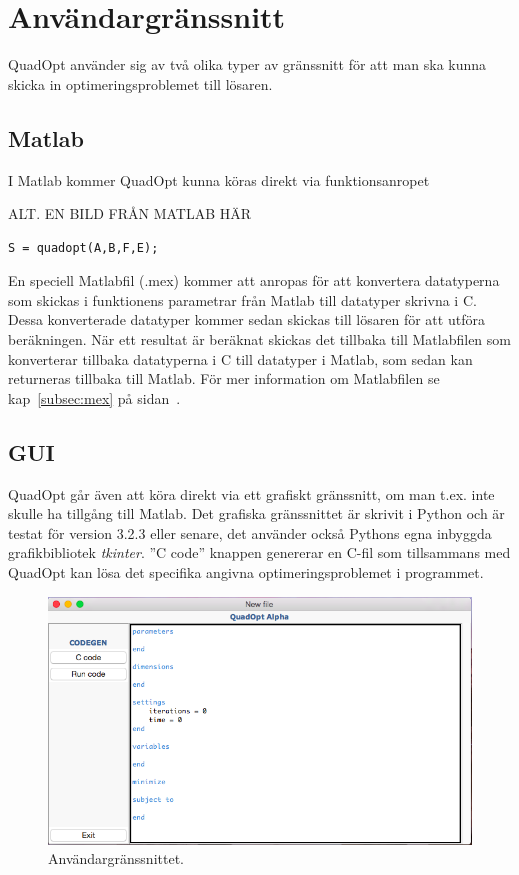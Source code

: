 \section{Användargränssnitt}
QuadOpt använder sig av två olika typer av gränssnitt för att man ska kunna skicka in optimeringsproblemet till lösaren.

\subsection{Matlab}
I Matlab kommer QuadOpt kunna köras direkt via funktionsanropet

ALT. EN BILD FRÅN MATLAB HÄR

\begin{lstlisting}
S = quadopt(A,B,F,E);
\end{lstlisting}
En speciell Matlabfil (.mex) kommer att anropas för att konvertera datatyperna som skickas i funktionens parametrar från Matlab till datatyper skrivna i C. Dessa konverterade datatyper kommer sedan skickas till lösaren för att utföra beräkningen. När ett resultat är beräknat skickas det tillbaka till Matlabfilen som konverterar tillbaka datatyperna i C till datatyper i Matlab, som sedan kan returneras tillbaka till Matlab.
För mer information om Matlabfilen se kap~\ref{subsec:mex} på sidan~\pageref{subsec:mex}.

\subsection{GUI}
QuadOpt går även att köra direkt via ett grafiskt gränssnitt, om man t.ex. inte skulle ha tillgång till Matlab. Det grafiska gränssnittet är skrivit i Python och är testat för version 3.2.3 eller senare, det använder också Pythons egna inbyggda grafikbibliotek \emph{tkinter}. ''C code'' knappen genererar en C-fil som tillsammans med QuadOpt kan lösa det specifika angivna optimeringsproblemet i programmet.

\begin{figure}[h]
	\begin{center}
		\includegraphics[scale=0.5]{bilder/macgui.png}
	\end{center}
	\caption{Användargränssnittet.}
\end{figure}

